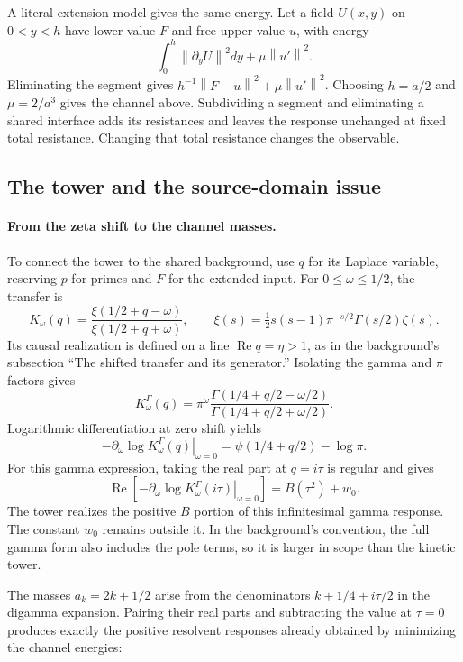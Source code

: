 \documentclass[11pt]{article}
\numberwithin{equation}{section}
\theoremstyle{definition}
\theoremstyle{remark}
\newcommand{\re}{\operatorname{Re}}
\newcommand{\norm}[1]{\left\lVert#1\right\rVert}
\begin{document}
A literal extension model gives the same energy. Let a field $U(x,y)$ on $0<y<h$ have lower value $F$ and free upper value $u$, with energy
\begin{equation}
 \int_0^h\norm{\partial_yU}^2dy+\mu\norm{u'}^2.
\end{equation}
Eliminating the segment gives $h^{-1}\norm{F-u}^2+\mu\norm{u'}^2$. Choosing $h=a/2$ and $\mu=2/a^3$ gives the channel above. Subdividing a segment and eliminating a shared interface adds its resistances and leaves the response unchanged at fixed total resistance. Changing that total resistance changes the observable.

\subsection{The tower and the source-domain issue}
\label{subsec:gamma-tower}
\paragraph{From the zeta shift to the channel masses.}
To connect the tower to the shared background, use $q$ for its Laplace variable, reserving $p$ for primes and $F$ for the extended input. For $0\leq\omega\leq1/2$, the transfer is
\[
K_\omega(q)=\frac{\xi(1/2+q-\omega)}{\xi(1/2+q+\omega)},
\qquad
\xi(s)=\tfrac12s(s-1)\pi^{-s/2}\Gamma(s/2)\zeta(s).
\]
Its causal realization is defined on a line $\re q=\eta>1$, as in the background's subsection ``The shifted transfer and its generator.'' Isolating the gamma and $\pi$ factors gives
\[
K^\Gamma_\omega(q)=\pi^\omega
\frac{\Gamma(1/4+q/2-\omega/2)}
     {\Gamma(1/4+q/2+\omega/2)}.
\]
Logarithmic differentiation at zero shift yields
\[
-\left.\partial_\omega\log K^\Gamma_\omega(q)\right|_{\omega=0}
=\psi(1/4+q/2)-\log\pi.
\]
For this gamma expression, taking the real part at $q=i\tau$ is regular and gives
\[
\re\!\left[-\left.\partial_\omega\log K^\Gamma_\omega(i\tau)
\right|_{\omega=0}\right]
=B(\tau^2)+w_0.
\]
The tower realizes the positive $B$ portion of this infinitesimal gamma response. The constant $w_0$ remains outside it. In the background's convention, the full gamma form also includes the pole terms, so it is larger in scope than the kinetic tower.

The masses $a_k=2k+1/2$ arise from the denominators $k+1/4+i\tau/2$ in the digamma expansion. Pairing their real parts and subtracting the value at $\tau=0$ produces exactly the positive resolvent responses already obtained by minimizing the channel energies:
\end{document}
